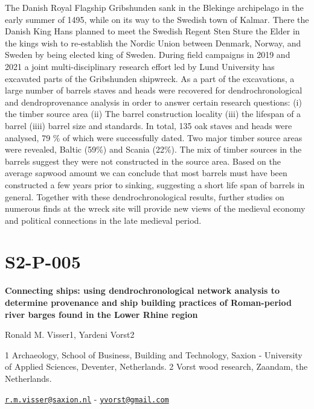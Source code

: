 \documentclass[
]{book}
\begin{document}
The Danish Royal Flagship Gribshunden sank in the Blekinge archipelago in the early summer of 1495, while on its way to the Swedish town of Kalmar. There the Danish King Hans planned to meet the Swedish Regent Sten Sture the Elder in the kings wish to re-establish the Nordic Union between Denmark, Norway, and Sweden by being elected king of Sweden. During field campaigns in 2019 and 2021 a joint multi-disciplinary research effort led by Lund University has excavated parts of the Gribshunden shipwreck. As a part of the excavations, a large number of barrels staves and heads were recovered for dendrochronological and dendroprovenance analysis in order to answer certain research questions: (i) the timber source area (ii) The barrel construction locality (iii) the lifespan of a barrel (iiii) barrel size and standards. In total, 135 oak staves and heads were analysed, 79 \% of which were successfully dated. Two major timber source areas were revealed, Baltic (59\%) and Scania (22\%). The mix of timber sources in the barrels suggest they were not constructed in the source area. Based on the average sapwood amount we can conclude that most barrels must have been constructed a few years prior to sinking, suggesting a short life span of barrels in general. Together with these dendrochronological results, further studies on numerous finds at the wreck site will provide new views of the medieval economy and political connections in the late medieval period.

\hypertarget{s2-p-005}{%
\section*{S2-P-005}\label{s2-p-005}}

\textbf{Connecting ships: using dendrochronological network analysis to determine provenance and ship building practices of Roman-period river barges found in the Lower Rhine region}

Ronald M. Visser1, Yardeni Vorst2

1 Archaeology, School of Business, Building and Technology, Saxion - University of Applied Sciences, Deventer, Netherlands. 2 Vorst wood research, Zaandam, the Netherlands.

\href{mailto:r.m.visser@saxion.nl}{\nolinkurl{r.m.visser@saxion.nl}} - \href{mailto:yvorst@gmail.com}{\nolinkurl{yvorst@gmail.com}}
\end{document}
